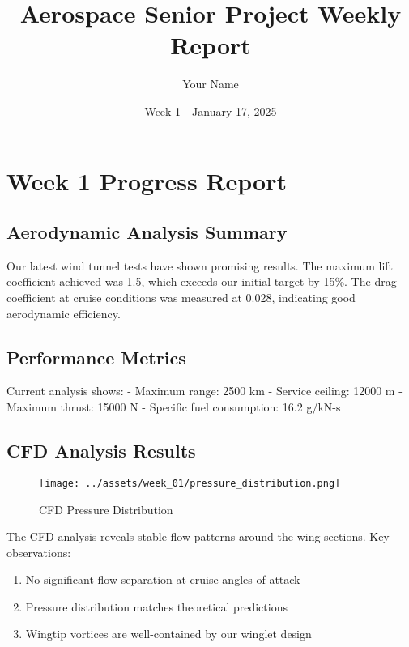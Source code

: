 \documentclass[12pt]{article}
\title{Aerospace Senior Project Weekly Report}
\author{Your Name}
\date{Week 1 - January 17, 2025}
\begin{document}
\maketitle

\section{Week 1 Progress Report}\label{week-1-progress-report}

\subsection{Aerodynamic Analysis
Summary}\label{aerodynamic-analysis-summary}

Our latest wind tunnel tests have shown promising results. The maximum
lift coefficient achieved was 1.5, which exceeds our initial target by
15\%. The drag coefficient at cruise conditions was measured at 0.028,
indicating good aerodynamic efficiency.

\subsection{Performance Metrics}\label{performance-metrics}

Current analysis shows: - Maximum range: 2500 km - Service ceiling:
12000 m - Maximum thrust: 15000 N - Specific fuel consumption: 16.2
g/kN-s

\subsection{CFD Analysis Results}\label{cfd-analysis-results}

\begin{figure}
\centering
\texttt{[image: ../assets/week\_01/pressure\_distribution.png]}
\caption{CFD Pressure Distribution}
\end{figure}

The CFD analysis reveals stable flow patterns around the wing sections.
Key observations:

\begin{enumerate}
\def\labelenumi{\arabic{enumi}.}
\tightlist
\item
  No significant flow separation at cruise angles of attack
\item
  Pressure distribution matches theoretical predictions
\item
  Wingtip vortices are well-contained by our winglet design
\end{enumerate}
\end{document}
